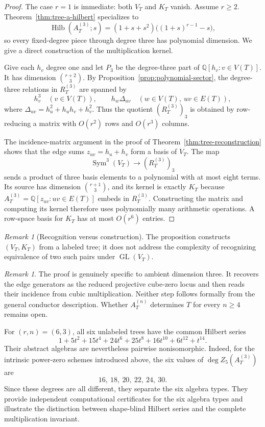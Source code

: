 \documentclass[11pt]{amsart}
\theoremstyle{plain}
\theoremstyle{definition}
\theoremstyle{remark}
\newtheorem{remark}[theorem]{Remark}
\newcommand{\Q}{\mathbb{Q}}
\begin{document}
\begin{proof}
The case $r=1$ is immediate: both $V_T$ and $K_T$ vanish.  Assume $r\geq2$.
Theorem~\ref{thm:tree-a-hilbert} specializes to
\[
  \operatorname{Hilb}(A_T^{(3)};s)
  =(1+s+s^2)\bigl((1+s)^{r-1}-s\bigr),
\]
so every fixed-degree piece through degree three has polynomial dimension.
We give a direct construction of the multiplication kernel.

Give each $h_v$ degree one and let $P_3$ be the degree-three part of
$\Q[h_v:v\in V(T)]$.  It has dimension $\binom{r+2}{3}$.  By
Proposition~\ref{prop:polynomial-sector}, the degree-three relations in
$R_T^{(3)}$ are spanned by
\[
  h_v^3\quad(v\in V(T)),
  \qquad
  h_w\Delta_{uv}\quad(w\in V(T),\ uv\in E(T)),
\]
where $\Delta_{uv}=h_u^2+h_uh_v+h_v^2$.  Thus the quotient
$(R_T^{(3)})_3$ is obtained by row-reducing a matrix with $O(r^2)$ rows and
$O(r^3)$ columns.

The incidence-matrix argument in the proof of
Theorem~\ref{thm:tree-reconstruction} shows that the edge sums
$z_{uv}=h_u+h_v$ form a basis of $V_T$.  The map
\[
  \operatorname{Sym}^3(V_T)\longrightarrow (R_T^{(3)})_3
\]
sends a product of three basis elements to a polynomial with at most eight
terms.  Its source has dimension $\binom{r+1}{3}$, and its kernel is exactly
$K_T$ because $A_T^{(3)}=\Q[z_{uv}:uv\in E(T)]$ embeds in $R_T^{(3)}$.
Constructing the matrix and computing its kernel therefore uses polynomially
many arithmetic operations.  A row-space basis for $K_T$ has at most
$O(r^6)$ entries.
\end{proof}

\begin{remark}[Recognition versus construction]
\label{rem:tree-cubic-algorithmic-scope}
The proposition constructs $(V_T,K_T)$ from a labeled tree; it does not address
the complexity of recognizing equivalence of two such pairs under
$\operatorname{GL}(V_T)$.
\end{remark}

\begin{remark}\label{rem:tree-reconstruction-dimension}
The proof is genuinely specific to ambient dimension three.  It recovers the
edge generators as the reduced projective cube-zero locus and then reads their
incidence from cubic multiplication.  Neither step follows formally from the
general conductor description.  Whether $A_T^{(n)}$ determines $T$ for every
$n\geq 4$ remains open.
\end{remark}

For $(r,n)=(6,3)$, all six unlabeled trees have the common Hilbert series
\[
  1+5t^2+15t^4+24t^6+25t^8+16t^{10}+6t^{12}+t^{14}.
\]
Their abstract algebras are nevertheless pairwise nonisomorphic.  Indeed, for
the intrinsic power-zero schemes introduced above, the six values of
$\deg Z_5(A_T^{(3)})$ are
\[
  16,\ 18,\ 20,\ 22,\ 24,\ 30.
\]
Since these degrees are all different, they separate the six algebra types.
They provide independent computational certificates for the six algebra
types and illustrate the distinction between shape-blind Hilbert series and
the complete multiplication invariant.
\end{document}
